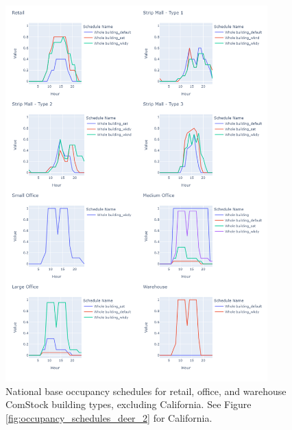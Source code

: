 \begin{figure}
    \centering \includegraphics[trim={0 0 0 0}, clip,  %
    width=0.9\textwidth]{figures/occupancy_schedules_2.png}
    \caption[National base occupancy schedules excluding California]{National base occupancy schedules for retail, office, and warehouse ComStock building types, excluding California. See Figure \ref{fig:occupancy_schedules_deer_2} for California.}
    \label{fig:occupancy_schedules_2}
\end{figure} 